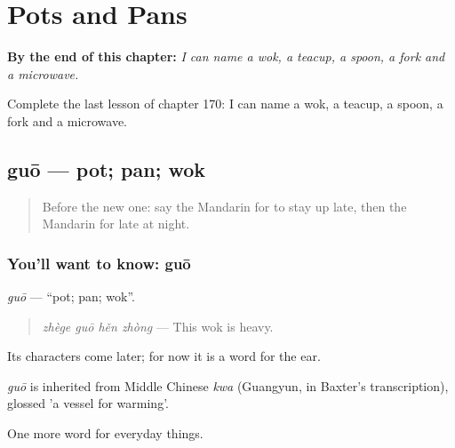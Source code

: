 
\chapter{Pots and Pans}
\label{ch:zh-pots-and-pans}

\begin{chapteropening}
\textbf{By the end of this chapter:} \emph{I can name a wok, a teacup, a spoon, a fork and a microwave.}

Complete the last lesson of chapter 170: I can name a wok, a teacup, a spoon, a fork and a microwave.
\end{chapteropening}

\section[guō]{guō — pot; pan; wok}

\label{lesson:ZH-C170-guo}



\begin{quote}
Before the new one: say the Mandarin for to stay up late, then the Mandarin for late at night.
\end{quote}

\subsection*{You'll want to know: guō}
\emph{guō} — \textquotedblleft{}pot; pan; wok\textquotedblright{}.

\begin{quote}
\emph{zhège guō hěn zhòng} — This wok is heavy.
\end{quote}

Its characters come later; for now it is a word for the ear.

\begin{cousinweb}
\emph{guō} is inherited from Middle Chinese \emph{kwa} (Guangyun, in Baxter's transcription), glossed 'a vessel for warming'.
\end{cousinweb}

\begin{grammarlens}[title={What you've built}]
One more word for everyday things.
\end{grammarlens}

